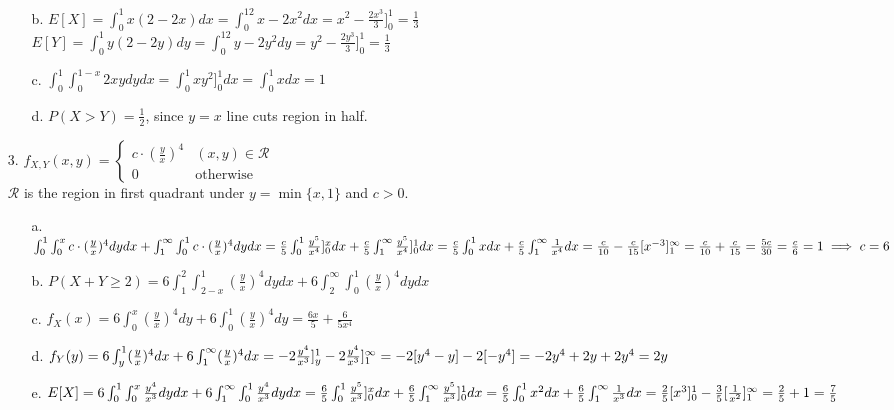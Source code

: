 \documentclass[11pt]{amsart}
\theoremstyle{definition}
\begin{document}
\begin{itemize}
\begin{itemize}
    \item[b.] $E[X]=\int_0^1x(2-2x)dx=\int_0^12x-2x^2dx=x^2-\frac{2x^3}3]_0^1=\frac 13$ \\
              $E[Y]=\int_0^1y(2-2y)dy=\int_0^12y-2y^2dy=y^2-\frac{2y^3}3]_0^1=\frac 13$

    \item[c.] $\int_0^1\int_0^{1-x}2xydydx=\int_0^1xy^2]_0^1dx=\int_0^1xdx=1$

    \item[d.] $P(X>Y)=\frac 12$, since $y=x$ line cuts region in half.
    
\end{itemize}

\item[3.]$f_{X,Y}(x,y)=\begin{cases}
    c\cdot (\frac yx)^4 &(x,y)\in \mathcal{R}\\
    0 &\text{otherwise}
\end{cases}$ \\
$\mathcal{R}$ is the region in first quadrant under $y=\min\{x,1\}$ and $c>0$.
\begin{itemize}
    \item[a.] $\int_0^1\int_0^xc\cdot (\frac yx)^4dydx+\int_1^\infty\int_0^1c\cdot (\frac yx)^4dydx \\
              =\frac c5\int_0^1\frac{y^5}{x^4}]_0^xdx+\frac c5\int_1^\infty\frac{y^5}{x^4}]_0^1dx \\
              =\frac c5\int_0^1xdx+\frac c5\int_1^\infty\frac1{x^4}dx\\
              =\frac c{10}-\frac c{15}[x^{-3}]_1^\infty \\
              =\frac c{10}+\frac c{15}=\frac{5c}{30}=\frac c6=1\implies c=6$

    \item[b.] $P(X+Y\ge 2)=6\int_1^2\int_{2-x}^1(\frac yx)^4dydx+6\int_2^\infty\int_0^1(\frac yx)^4dydx$

    \item[c.] $f_X(x)=6\int_0^x(\frac yx)^4dy+6\int_0^1(\frac yx)^4dy
              =\frac {6x}{5}+\frac{6}{5x^4}$

    \item[d.] $f_Y(y)=6\int_y^1(\frac yx)^4dx+6\int_1^\infty(\frac yx)^4dx
              =-2\frac {y^4}{x^3}]_y^1-2\frac {y^4}{x^3}]_1^\infty\\
              =-2[y^4-y]-2[-y^4]=-2y^4+2y+2y^4=2y$

    \item[e.] $E[X]=6\int_0^1\int_0^x\frac {y^4}{x^3}dydx+6\int_1^\infty\int_0^1\frac {y^4}{x^3}dydx
              =\frac65\int_0^1\frac {y^5}{x^3}]_0^xdx+\frac65\int_1^\infty\frac {y^5}{x^3}]_0^1dx\\
              =\frac65\int_0^1x^2dx+\frac65\int_1^\infty\frac 1{x^3}dx
              =\frac25[x^3]_0^1-\frac35[\frac 1{x^2}]_1^\infty\\
              =\frac25+1=\frac{7}5$


\end{itemize}
\end{itemize}
\end{document}
